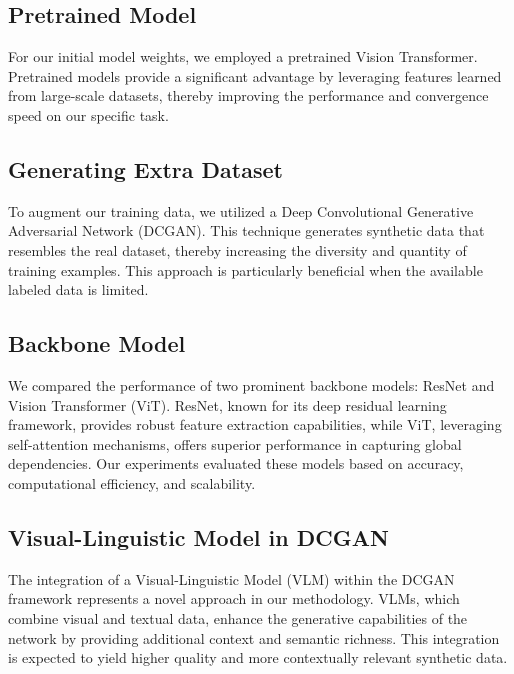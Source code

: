 \subsection{Pretrained Model}
For our initial model weights, we employed a pretrained Vision Transformer. Pretrained models provide a significant advantage by leveraging features learned from large-scale datasets, thereby improving the performance and convergence speed on our specific task.

\subsection{Generating Extra Dataset}
To augment our training data, we utilized a Deep Convolutional Generative Adversarial Network (DCGAN). This technique generates synthetic data that resembles the real dataset, thereby increasing the diversity and quantity of training examples. This approach is particularly beneficial when the available labeled data is limited.

\subsection{Backbone Model}
We compared the performance of two prominent backbone models: ResNet and Vision Transformer (ViT). ResNet, known for its deep residual learning framework, provides robust feature extraction capabilities, while ViT, leveraging self-attention mechanisms, offers superior performance in capturing global dependencies. Our experiments evaluated these models based on accuracy, computational efficiency, and scalability.

\subsection{Visual-Linguistic Model in DCGAN}
The integration of a Visual-Linguistic Model (VLM) within the DCGAN framework represents a novel approach in our methodology. VLMs, which combine visual and textual data, enhance the generative capabilities of the network by providing additional context and semantic richness. This integration is expected to yield higher quality and more contextually relevant synthetic data.

